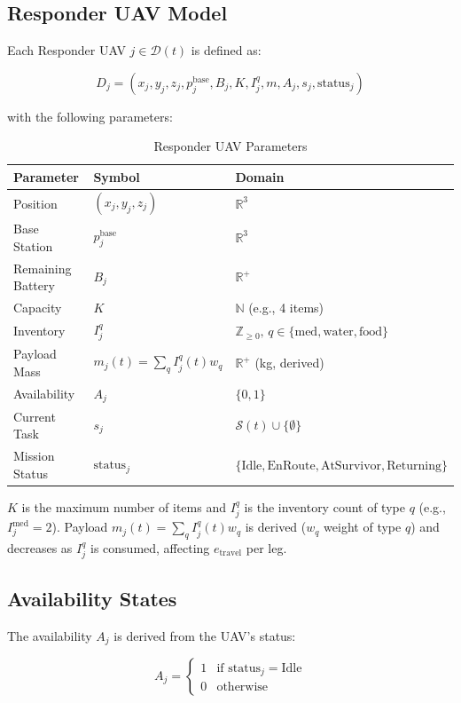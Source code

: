 \documentclass[conference]{IEEEtran}
\begin{document}
\subsection{Responder UAV Model}
Each Responder UAV $j \in \mathcal{D}(t)$ is defined as:

\begin{equation}
D_j = (x_j, y_j, z_j, p_j^{\text{base}}, B_j, K, I_j^q, m, A_j, s_j, \text{status}_j)
\end{equation}

with the following parameters:

\begin{table}[h]
\centering
\caption{Responder UAV Parameters}
\label{tab:uav}
\begin{tabular}{lll}
\toprule
\textbf{Parameter} & \textbf{Symbol} & \textbf{Domain} \\
\midrule
Position & $(x_j,y_j,z_j)$ & $\mathbb{R}^3$ \\
Base Station & $p_j^{\text{base}}$ & $\mathbb{R}^3$ \\
Remaining Battery & $B_j$ & $\mathbb{R}^+$ \\
Capacity & $K$ & $\mathbb{N}$ (e.g., 4 items) \\
Inventory & $I_j^q$ & $\mathbb{Z}_{\ge0},\,q\in\{\text{med},\text{water},\text{food}\}$ \\
Payload Mass & $m_j(t)=\sum_q I_j^q(t)w_q$ & $\mathbb{R}^+$ (kg, derived) \\
Availability & $A_j$ & $\{0,1\}$ \\
Current Task & $s_j$ & $\mathcal{S}(t) \cup \{\emptyset\}$ \\
Mission Status & $\text{status}_j$ & $\{\text{Idle}, \text{EnRoute}, \text{AtSurvivor}, \text{Returning}\}$ \\
\bottomrule
\end{tabular}
\end{table}
$K$ is the maximum number of items and $I_j^q$ is the inventory count of type $q$ (e.g., $I_j^{\text{med}}=2$). Payload $m_j(t)=\sum_q I_j^q(t)w_q$ is derived ($w_q$ weight of type $q$) and decreases as $I_j^q$ is consumed, affecting $e_{\text{travel}}$ per leg.

\subsection{Availability States}
The availability $A_j$ is derived from the UAV's status:

\begin{equation}
A_j = \begin{cases}
1 & \text{if status}_j = \text{Idle} \\
0 & \text{otherwise}
\end{cases}
\end{equation}
\end{document}
